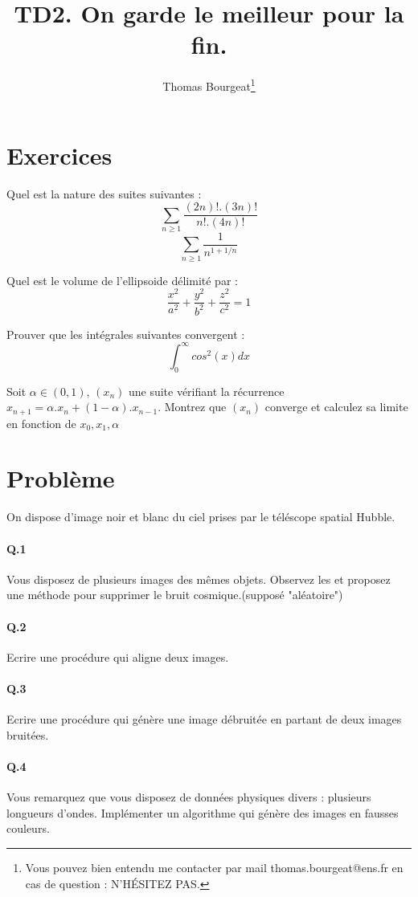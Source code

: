\documentclass[10pt,a4paper]{article}
\begin{document}
\title{TD2. On garde le meilleur pour la fin.}
\author{Thomas Bourgeat\footnote{Vous pouvez bien entendu me contacter par mail thomas.bourgeat@ens.fr en cas de question : N'HÉSITEZ PAS.}}
\maketitle{}

\section{Exercices}
Quel est la nature des suites suivantes :
$$\sum_{n\geq 1} \frac{(2n)!.(3n)!}{n!.(4n)!}$$
$$\sum_{n\geq 1} \frac{1}{n^{1+1/n}}$$

Quel est le volume de l'ellipsoide délimité par : 
$$\frac{x^2}{a^2}+\frac{y^2}{b^2}+\frac{z^2}{c^2}=1$$

Prouver que les intégrales suivantes convergent :
$$\int_{0}^{\infty} cos^2(x)dx$$ 

Soit $\alpha \in (0,1)$, $(x_n)$ une suite vérifiant la récurrence 
$x_{n+1}= \alpha.x_n+(1-\alpha).x_{n-1}$.
Montrez que $(x_n)$ converge et calculez sa limite en fonction de
$x_0,x_1,\alpha$

\section{Problème}
On dispose d'image noir et blanc du ciel prises par le téléscope spatial
Hubble.
\paragraph{Q.1} Vous disposez de plusieurs images des mêmes objets.
Observez les et proposez une méthode pour supprimer le bruit
cosmique.(supposé "aléatoire")

\paragraph{Q.2} Ecrire une procédure qui aligne deux images.

\paragraph{Q.3} Ecrire une procédure qui génère une image débruitée en
partant de deux images bruitées.

\paragraph{Q.4} Vous remarquez que vous disposez de données physiques
divers : plusieurs longueurs d'ondes. Implémenter un algorithme qui
génère des images en fausses couleurs.  
\end{document}
